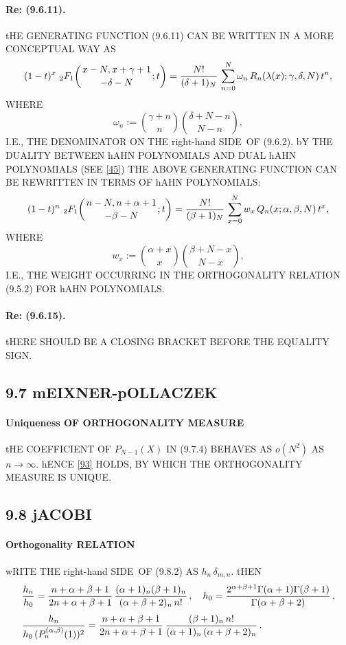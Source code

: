 \documentclass[twoside,11pt]{article}
\newcommand\sa{\smallskipamount}
\newcommand\sLP{\\[\sa]}
\newcommand\al\alpha
\newcommand\be\beta
\newcommand\ga\gamma
\newcommand\de\delta
\newcommand\la\lambda
\newcommand\om\omega
\newcommand\Ga{\Gamma}
\newcommand\iy\infty
\newcommand{\hyp}[5]{\,\mbox{}_{#1}F_{#2}\!\left( 
  \genfrac{}{}{0pt}{}{#3}{#4};#5\right)}
\newcommand\RHS{right-hand SIDE}
\begin{document}
\paragraph{Re: (9.6.11).} 
tHE GENERATING FUNCTION (9.6.11) CAN BE WRITTEN IN A MORE CONCEPTUAL WAY AS 
\begin{equation} 
(1-t)^x\,\hyp21{x-N,x+\ga+1}{-\de-N}t=\frac{N!}{(\de+1)_N}\, 
\sum_{n=0}^N \om_n\,R_n(\la(x);\ga,\de,N)\,t^n, 
\label{2} 
\end{equation} 
WHERE 
\begin{equation} 
\om_n:=\binom{\ga+n}n \binom{\de+N-n}{N-n}, 
\label{3} 
\end{equation} 
I.E., THE DENOMINATOR ON THE \RHS\ OF (9.6.2). 
bY THE DUALITY BETWEEN hAHN POLYNOMIALS AND DUAL hAHN POLYNOMIALS (SEE \eqref{45}) THE ABOVE GENERATING FUNCTION CAN BE REWRITTEN IN 
TERMS OF hAHN POLYNOMIALS: 
\begin{equation} 
(1-t)^n\,\hyp21{n-N,n+\al+1}{-\be-N}t=\frac{N!}{(\be+1)_N}\, 
\sum_{x=0}^N w_x\,Q_n(x;\al,\be,N)\,t^x, 
\label{4} 
\end{equation} 
WHERE 
\begin{equation} 
w_x:=\binom{\al+x}x \binom{\be+N-x}{N-x}, 
\label{5} 
\end{equation} 
I.E., THE WEIGHT OCCURRING IN THE ORTHOGONALITY RELATION (9.5.2) 
FOR hAHN POLYNOMIALS. 
\paragraph{Re: (9.6.15).} 
tHERE SHOULD BE A CLOSING BRACKET BEFORE THE EQUALITY SIGN. 
% 
\subsection*{9.7 mEIXNER-pOLLACZEK} 
\label{sec9.7} 
% 
\paragraph{Uniqueness OF ORTHOGONALITY MEASURE} 
tHE COEFFICIENT OF $P_{N-1}(X)$ IN (9.7.4) BEHAVES AS $o(N^2)$ AS $n\to\iy$. 
hENCE \eqref{93} HOLDS, BY WHICH THE ORTHOGONALITY MEASURE IS UNIQUE. 
% 
\subsection*{9.8 jACOBI} 
\label{sec9.8} 
% 
\paragraph{Orthogonality RELATION} 
wRITE THE \RHS\ OF (9.8.2) AS $h_n\,\de_{m,n}$. tHEN 
\begin{equation} 
\begin{split} 
&\frac{h_n}{h_0}= 
\frac{n+\al+\be+1}{2n+\al+\be+1}\, 
\frac{(\al+1)_n(\be+1)_n}{(\al+\be+2)_n\,n!}\,,\quad 
h_0=\frac{2^{\al+\be+1}\Ga(\al+1)\Ga(\be+1)}{\Ga(\al+\be+2)}\,,\sLP 
&\frac{h_n}{h_0\,(P_n^{(\al,\be)}(1))^2}= 
\frac{n+\al+\be+1}{2n+\al+\be+1}\, 
\frac{(\be+1)_n\,n!}{(\al+1)_n\,(\al+\be+2)_n}\,. 
\end{split} 
\label{60} 
\end{equation} 
 
\end{document}
